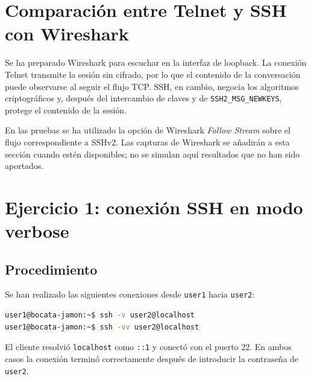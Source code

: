 \documentclass[11pt,a4paper]{article}
\begin{document}
\section{Comparación entre Telnet y SSH con Wireshark}
Se ha preparado Wireshark para escuchar en la interfaz de loopback. La conexión
Telnet transmite la sesión sin cifrado, por lo que el contenido de la
conversación puede observarse al seguir el flujo TCP. SSH, en cambio, negocia
los algoritmos criptográficos y, después del intercambio de claves y de
\texttt{SSH2\_MSG\_NEWKEYS}, protege el contenido de la sesión.

En las pruebas se ha utilizado la opción de Wireshark \emph{Follow Stream} sobre el
flujo correspondiente a SSHv2. Las capturas de Wireshark se añadirán a esta
sección cuando estén disponibles; no se simulan aquí resultados que no han
sido aportados.

\section{Ejercicio 1: conexión SSH en modo verbose}
\subsection{Procedimiento}
Se han realizado las siguientes conexiones desde \texttt{user1} hacia
\texttt{user2}:
\begin{lstlisting}[language=bash]
user1@bocata-jamon:~$ ssh -v user2@localhost
user1@bocata-jamon:~$ ssh -vv user2@localhost
\end{lstlisting}
El cliente resolvió \texttt{localhost} como \texttt{::1} y conectó con el
puerto 22. En ambos casos la conexión terminó correctamente después de
introducir la contraseña de \texttt{user2}.
\end{document}
